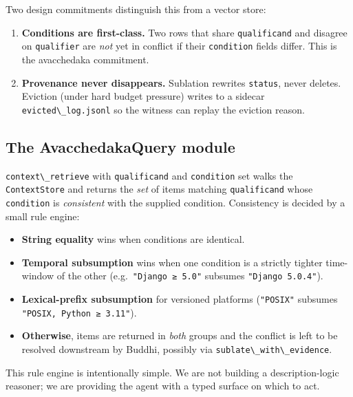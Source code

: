 Two design commitments distinguish this from a vector store:

\begin{enumerate}
\def\labelenumi{\arabic{enumi}.}
\item
  \textbf{Conditions are first-class.} Two rows that share \passthrough{\lstinline!qualificand!} and disagree on \passthrough{\lstinline!qualifier!} are \emph{not} yet in conflict if their \passthrough{\lstinline!condition!} fields differ. This is the avacchedaka commitment.
\item
  \textbf{Provenance never disappears.} Sublation rewrites \passthrough{\lstinline!status!}, never deletes. Eviction (under hard budget pressure) writes to a sidecar \passthrough{\lstinline!evicted\_log.jsonl!} so the witness can replay the eviction reason.
\end{enumerate}

\subsection{The AvacchedakaQuery module}\label{the-avacchedakaquery-module}

\passthrough{\lstinline!context\_retrieve!} with \passthrough{\lstinline!qualificand!} and \passthrough{\lstinline!condition!} set walks the \passthrough{\lstinline!ContextStore!} and returns the \emph{set} of items matching \passthrough{\lstinline!qualificand!} whose \passthrough{\lstinline!condition!} is \emph{consistent} with the supplied condition. Consistency is decided by a small rule engine:

\begin{itemize}
\tightlist
\item
  \textbf{String equality} wins when conditions are identical.
\item
  \textbf{Temporal subsumption} wins when one condition is a strictly tighter time-window of the other (e.g.~\passthrough{\lstinline!"Django ≥ 5.0"!} subsumes \passthrough{\lstinline!"Django 5.0.4"!}).
\item
  \textbf{Lexical-prefix subsumption} for versioned platforms (\passthrough{\lstinline!"POSIX"!} subsumes \passthrough{\lstinline!"POSIX, Python ≥ 3.11"!}).
\item
  \textbf{Otherwise}, items are returned in \emph{both} groups and the conflict is left to be resolved downstream by Buddhi, possibly via \passthrough{\lstinline!sublate\_with\_evidence!}.
\end{itemize}

This rule engine is intentionally simple. We are not building a description-logic reasoner; we are providing the agent with a typed surface on which to act.

